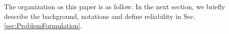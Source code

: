 The organization os this paper is as follow. In the next section, we briefly describe the background, notations and define reliability in Sec.\ref{sec:ProblemFormulation}.
%

